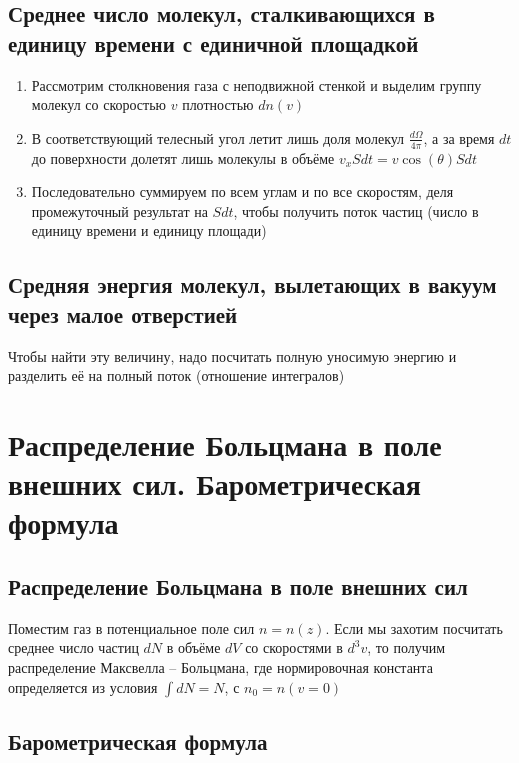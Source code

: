 \documentclass[a4paper, 14pt]{article}
\begin{document}
    \subsection{Среднее число молекул, сталкивающихся в единицу времени с единичной площадкой}

    \begin{enumerate}
        \item Рассмотрим столкновения газа с неподвижной стенкой и выделим группу молекул со скоростью $v$ плотностью
        $dn(v)$
        \item В соответствующий телесный угол летит лишь доля молекул $\frac{d\Omega}{4\pi}$, а за время $dt$ до
        поверхности долетят лишь молекулы в объёме $v_x Sdt = v \cos(\theta) Sdt$
        \item Последовательно суммируем по всем углам и по все скоростям, деля промежуточный результат на $Sdt$,
        чтобы получить поток частиц (число в единицу времени и единицу площади)
    \end{enumerate}

    \subsection{Средняя энергия молекул, вылетающих в вакуум через малое отверстией}

    Чтобы найти эту величину, надо посчитать полную уносимую энергию и разделить её на полный поток (отношение
    интегралов)

    \section{Распределение Больцмана в поле внешних сил.
    Барометрическая формула}

    \subsection{Распределение Больцмана в поле внешних сил}

    Поместим газ в потенциальное поле сил $n = n(z)$.
    Если мы захотим посчитать среднее число частиц $dN$ в объёме $dV$ со скоростями в $d^3 v$, то получим
    распределение Максвелла -- Больцмана, где нормировочная константа определяется из условия $\int dN = N$, с $n_0
    = n(v = 0)$

    \subsection{Барометрическая формула}
\end{document}
